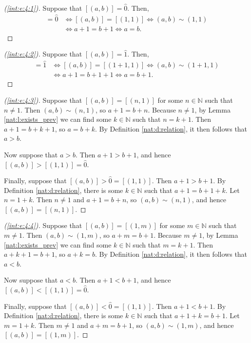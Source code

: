 \begin{proof}[(\ref{int:e:4:1})]
	Suppose that $[(a, b)] = \hat{0}$. Then,
	\begin{align*}
		[(a, b)] = \hat{0} & \iff [(a, b)] = [(1, 1)] \iff (a, b) \sim (1, 1) \\
		                   & \iff a + 1 = b + 1 \iff a = b.
	\end{align*}
\end{proof}

\begin{proof}[(\ref{int:e:4:2})]
	Suppose that $[(a, b)] = \hat{1}$. Then,
	\begin{align*}
		[(a, b)] = \hat{1} & \iff [(a,b)] = [(1 + 1, 1)] \iff (a, b) \sim (1 + 1, 1) \\
		                   & \iff a + 1 = b + 1 + 1 \iff a = b + 1.
	\end{align*}
\end{proof}

\begin{proof}[(\ref{int:e:4:3})]
	Suppose that $[(a, b)] = [(n, 1)]$ for some $n \in \mathbb{N}$ such that $n \not= 1$. Then ${(a, b) \sim (n, 1)}$, so $a + 1 = b + n$. Because $n \not= 1$, by Lemma \ref{nat:l:exists_prev} we can find some $k \in \mathbb{N}$ such that $n = k + 1$. Then $a + 1 = b + k + 1$, so $a = b + k$. By Definition \ref{nat:d:relation}, it then follows that $a > b$.

	Now suppose that $a > b$. Then $a + 1 > b + 1$, and hence $[(a, b)] > [(1, 1)] = \hat{0}$.

	Finally, suppose that $[(a, b)] > \hat{0} = [(1, 1)]$. Then $a + 1 > b + 1$. By Definition \ref{nat:d:relation}, there is some $k \in \mathbb{N}$ such that $a + 1 = b + 1 + k$. Let $n = 1 + k$. Then $n \not= 1$ and $a + 1 = b + n$, so $(a, b) \sim (n, 1)$, and hence $[(a, b)] = [(n, 1)]$.
\end{proof}

\begin{proof}[(\ref{int:e:4:4})]
	Suppose that $[(a, b)] = [(1, m)]$ for some $m \in \mathbb{N}$ such that $m \not= 1$. Then ${(a, b) \sim (1, m)}$, so $a + m = b + 1$. Because $m \not= 1$, by Lemma \ref{nat:l:exists_prev} we can find some $k \in \mathbb{N}$ such that $m = k + 1$. Then $a + k + 1 = b + 1$, so $a + k = b$. By Definition \ref{nat:d:relation}, it then follows that $a < b$.

	Now suppose that $a < b$. Then $a + 1 < b + 1$, and hence $[(a, b)] < [(1, 1)] = \hat{0}$.

	Finally, suppose that $[(a, b)] < \hat{0} = [(1, 1)]$. Then $a + 1 < b + 1$. By Definition \ref{nat:d:relation}, there is some $k \in \mathbb{N}$ such that $a + 1 + k = b + 1$. Let $m = 1 + k$. Then $m \not= 1$ and $a + m = b + 1$, so $(a, b) \sim (1, m)$, and hence $[(a, b)] = [(1, m)]$.
\end{proof}


